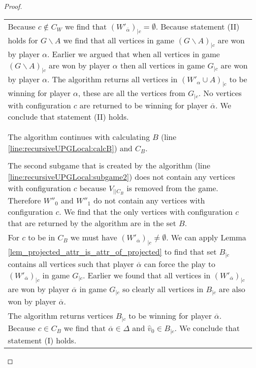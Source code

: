 \begin{theorem}
\begin{proof}
\begin{longtable}{|p{14.2cm}}
			\begin{tabular}{|p{14cm}}
				Assume $(W'_{\overline{\alpha}})_{|\backslash C_W} = \emptyset$ (line \ref{line:recursiveUPGLocal:wopponentwithoutCWisempty})\\
				\hline
				Because $c \notin C_W$ we find that $(W'_{\overline{\alpha}})_{|c} = \emptyset$. Because statement (II) holds for $G\backslash A$ we find that all vertices in game $(G \backslash A)_{|c}$ are won by player $\alpha$. Earlier we argued that when all vertices in game $(G\backslash A)_{|c}$ are won by player $\alpha$ then all vertices in game $G_{|c}$ are won by player $\alpha$. The algorithm returns all vertices in $(W'_\alpha \cup A)_{|c}$ to be winning for player $\alpha$, these are all the vertices from $G_{|c}$. No vertices with configuration $c$ are returned to be winning for player $\overline{\alpha}$. We conclude that statement (II) holds.
			\end{tabular}\\\\
			\begin{tabular}{|p{14cm}}
				Assume $(W'_{\overline{\alpha}})_{|\backslash C_W} \neq \emptyset$ (line \ref{line:recursiveUPGLocal:wopponentwithoutCWisempty})\\
				\hline
				The algorithm continues with calculating $B$ (line \ref{line:recursiveUPGLocal:calcB}) and $C_B$.\\
				\begin{tabular}{|p{13.8cm}}
					Assume $c \in C_B$\\
					\hline
					The second subgame that is created by the algorithm (line \ref{line:recursiveUPGLocal:subgame2}) does not contain any vertices with configuration $c$ because $V_{||C_B}$ is removed from the game. Therefore $W''_0$ and $W''_1$ do not contain any vertices with configuration $c$. We find that the only vertices with configuration $c$ that are returned by the algorithm are in the set $B$.\\
					For $c$ to be in $C_B$ we must have $(W'_{\overline{\alpha}})_{|c} \neq \emptyset$. We can apply Lemma \ref{lem_projected_attr_is_attr_of_projected} to find that set $B_{|c}$ contains all vertices such that player $\overline{\alpha}$ can force the play to $(W'_{\overline{\alpha}})_{|c}$ in game $G_{|c}$. Earlier we found that all vertices in $(W'_{\overline{\alpha}})_{|c}$ are won by player $\overline{\alpha}$ in game $G_{|c}$ so clearly all vertices in $B_{|c}$ are also won by player $\overline{\alpha}$.\\
					The algorithm returns vertices $B_{|c}$ to be winning for player $\overline{\alpha}$. Because $c \in C_B$ we find that $\overline{\alpha} \in \Delta$ and $\hat{v}_0 \in B_{|c}$. We conclude that statement (I) holds.

\end{tabular}
\end{tabular}
\end{longtable}
\end{proof}
\end{theorem}

